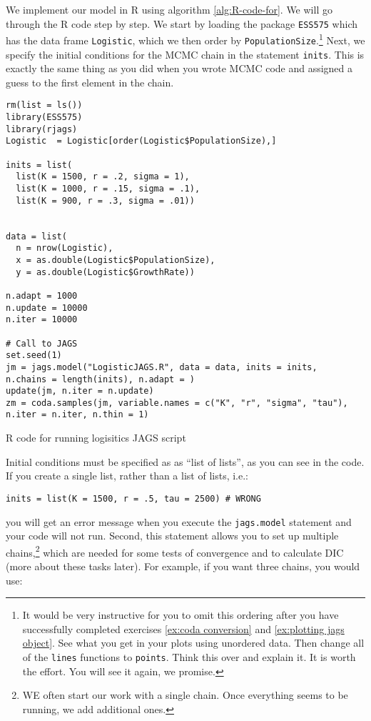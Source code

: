 \documentclass[12pt,english]{article}
\begin{document}
We implement our model in R using algorithm \ref{alg:R-code-for}. We will go through the R code step by step. We start by loading the package \texttt{ESS575} which has the data frame \texttt{Logistic}, which we then order by \texttt{PopulationSize}.\footnote{It would be very instructive for you to omit this ordering after you have successfully completed exercises \ref{ex:coda conversion} and \ref{ex:plotting jags object}. See what you get in your plots using unordered data. Then change all of the \texttt{lines} functions to \texttt{points}. Think this over and explain it. It is worth the effort. You will see it again, we promise.} Next, we specify the initial conditions for the MCMC chain in the statement \texttt{inits}. This is exactly the same thing as you did when you wrote MCMC code and assigned a guess to the first element in the chain. 

\begin{algorithm}
\begin{Verbatim}[frame=single]
rm(list = ls())
library(ESS575)
library(rjags)
Logistic  = Logistic[order(Logistic$PopulationSize),]

inits = list(
  list(K = 1500, r = .2, sigma = 1),
  list(K = 1000, r = .15, sigma = .1),
  list(K = 900, r = .3, sigma = .01))


data = list(
  n = nrow(Logistic),
  x = as.double(Logistic$PopulationSize),
  y = as.double(Logistic$GrowthRate))

n.adapt = 1000
n.update = 10000
n.iter = 10000

# Call to JAGS
set.seed(1)
jm = jags.model("LogisticJAGS.R", data = data, inits = inits, 
n.chains = length(inits), n.adapt = )
update(jm, n.iter = n.update)
zm = coda.samples(jm, variable.names = c("K", "r", "sigma", "tau"),
n.iter = n.iter, n.thin = 1)
\end{Verbatim}
\caption{R code for running logisitics JAGS script}
\label{alg:R-code-for}
\end{algorithm}

Initial conditions must be specified as as \enquote{list of lists}, as you can see in the code. If you create a single list, rather than a list of lists, i.e.:

\begin{Verbatim}
inits = list(K = 1500, r = .5, tau = 2500) # WRONG
\end{Verbatim}

\noindent you will get an error message when you execute the \texttt{jags.model} statement and your code will not run. Second, this statement allows you to set up multiple chains,\footnote{WE often start our work with a single chain. Once everything seems to be running, we add additional ones.} which are needed for some tests of convergence and to calculate DIC (more about these tasks later). For example, if you want three chains, you would use:
\end{document}
